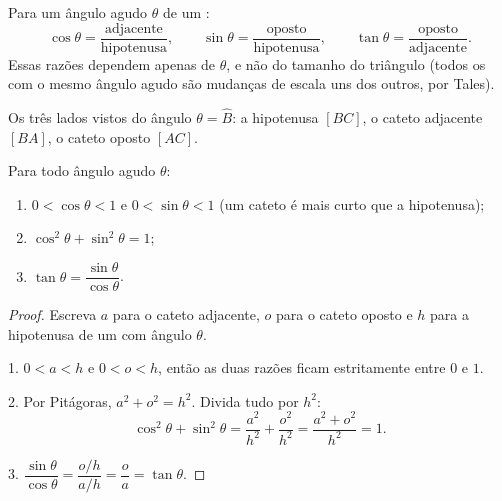\begin{definition}\label{def:g9:trig:ratios}
Para um ângulo agudo $\theta$ de um :
\[
\cos\theta = \frac{\text{adjacente}}{\text{hipotenusa}},
\qquad
\sin\theta = \frac{\text{oposto}}{\text{hipotenusa}},
\qquad
\tan\theta = \frac{\text{oposto}}{\text{adjacente}} .
\]
Essas razões dependem apenas
de $\theta$, e não do tamanho do triângulo (todos os  com o mesmo ângulo agudo são mudanças de escala uns dos
outros, por Tales).
\end{definition}

\begin{omfigure}

{\small Os três lados vistos do ângulo $\theta = \widehat B$: a
hipotenusa $[BC]$, o cateto adjacente $[BA]$, o cateto oposto $[AC]$.}
\end{omfigure}

\begin{proposition}\label{prop:g9:trig:properties}
Para todo ângulo agudo $\theta$:
\begin{enumerate}
  \item $0 < \cos\theta < 1$ e $0 < \sin\theta < 1$ (um cateto é mais
        curto que a hipotenusa);
  \item $\cos^2\theta + \sin^2\theta = 1$;
  \item $\tan\theta = \dfrac{\sin\theta}{\cos\theta}$.
\end{enumerate}
\end{proposition}

\begin{proof}
Escreva $a$ para o cateto adjacente, $o$ para o cateto oposto e $h$
para a hipotenusa de um  com ângulo $\theta$.

1. $0 < a < h$ e $0 < o < h$, então as duas razões ficam estritamente
entre $0$ e $1$.

2. Por Pitágoras, $a^2 + o^2 = h^2$. Divida tudo por $h^2$:
\[
\cos^2\theta + \sin^2\theta
= \frac{a^2}{h^2} + \frac{o^2}{h^2}
= \frac{a^2 + o^2}{h^2} = 1 .
\]

3. $\dfrac{\sin\theta}{\cos\theta} = \dfrac{o/h}{a/h} = \dfrac oa
= \tan\theta$.
\end{proof}

